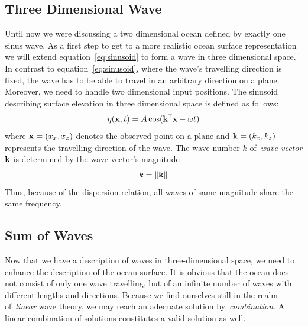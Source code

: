 \subsection{Three Dimensional Wave}
Until now we were discussing a two dimensional ocean defined by exactly one sinus wave. As a first
step to get to a more realistic ocean surface representation we will extend equation~\ref{eq:sinusoid}
to form a wave in three dimensional space. In contrast to equation~\ref{eq:sinusoid}, where the wave's
travelling direction is fixed, the wave has to be able to travel in an arbitrary direction on a plane.
Moreover, we need to handle two dimensional input positions. The sinusoid describing surface elevation
in three dimensional space is defined as follows:
\begin{equation}
\label{eq:sinusoid_3d}
 \eta(\mathbf{x}, t) = A\cos(\mathbf{k}^{\mathsf{T}}\mathbf{x} - \omega t)
\end{equation}
where $\mathbf{x} = (x_x, x_z)$ denotes the observed point on a plane and $\mathbf{k} = (k_x, k_z)$ represents
the travelling direction of the wave. The wave number $k$ of~\emph{wave vector} $\mathbf{k}$ is determined by
the wave vector's magnitude
\begin{equation}
 k = \lVert\mathbf{k}\rVert
\end{equation}
Thus, because of the dispersion relation, all waves of same magnitude share the same frequency.

\subsection{Sum of Waves}
Now that we have a description of waves in three-dimensional space, we need to
enhance the description of the ocean surface. It is obvious that the ocean does
not consist of only one wave travelling, but of an infinite number of waves with
different lengths and directions. Because we find ourselves still in the realm
of~\emph{linear} wave theory, we may reach an adequate solution
by~\emph{combination}. A linear combination of solutions constitutes a valid
solution as well.\\

